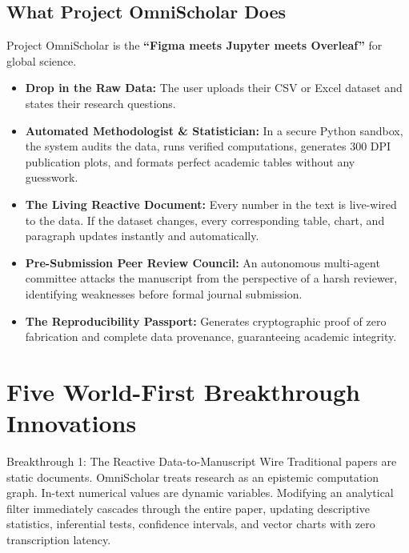 \documentclass[11pt,a4paper]{article}
\begin{document}
\subsection{What Project OmniScholar Does}
Project OmniScholar is the \textbf{``Figma meets Jupyter meets Overleaf''} for global science.
\begin{itemize}
    \item \textbf{Drop in the Raw Data:} The user uploads their CSV or Excel dataset and states their research questions.
    \item \textbf{Automated Methodologist \& Statistician:} In a secure Python sandbox, the system audits the data, runs verified computations, generates 300 DPI publication plots, and formats perfect academic tables without any guesswork.
    \item \textbf{The Living Reactive Document:} Every number in the text is live-wired to the data. If the dataset changes, every corresponding table, chart, and paragraph updates instantly and automatically.
    \item \textbf{Pre-Submission Peer Review Council:} An autonomous multi-agent committee attacks the manuscript from the perspective of a harsh reviewer, identifying weaknesses before formal journal submission.
    \item \textbf{The Reproducibility Passport:} Generates cryptographic proof of zero fabrication and complete data provenance, guaranteeing academic integrity.
\end{itemize}

\newpage

\section{Five World-First Breakthrough Innovations}

\begin{breakthroughbox}{Breakthrough 1: The Reactive Data-to-Manuscript Wire}
Traditional papers are static documents. OmniScholar treats research as an epistemic computation graph. In-text numerical values are dynamic variables. Modifying an analytical filter immediately cascades through the entire paper, updating descriptive statistics, inferential tests, confidence intervals, and vector charts with zero transcription latency.
\end{breakthroughbox}
\end{document}
